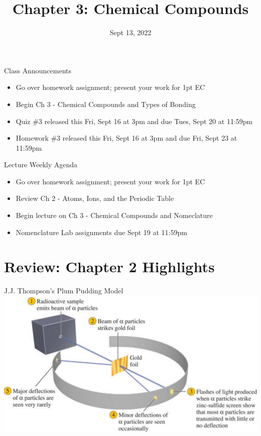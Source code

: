\documentclass[11pt]{beamer}
\title{Chapter 3: Chemical Compounds}
\institute{Chemistry Department, Cypress College}
\date{Sept 13, 2022}
\begin{document}
\begin{frame}
  \titlepage
\end{frame}

\begin{frame}{Class Announcements}
  \begin{itemize}
  \item Go over homework assignment; present your work
    for 1pt EC
  \item Begin Ch 3 - Chemical Compounds and Types of Bonding
  \item Quiz \#3 released this Fri, Sept 16 at 3pm and due Tues,
    Sept 20 at 11:59pm
  \item Homework \#3 released this Fri, Sept 16 at 3pm and due
    Fri, Sept 23 at 11:59pm
  \end{itemize}  
\end{frame}

\begin{frame}{Lecture Weekly Agenda}

  \begin{itemize}
  \item Go over homework assignment; present your work
    for 1pt EC
  \item Review Ch 2 - Atoms, Ions, and the Periodic Table
  \item Begin lecture on Ch 3 - Chemical Compounds and
    Nomeclature
  \item Nomenclature Lab assignments due Sept 19 at 11:59pm
  \end{itemize}
\end{frame}

\section{Review: Chapter 2 Highlights}

\begin{frame}{J.J. Thompson's Plum Pudding Model}
  \centering
  \includegraphics[scale=0.175]{alpha}
\end{frame}
\end{document}
